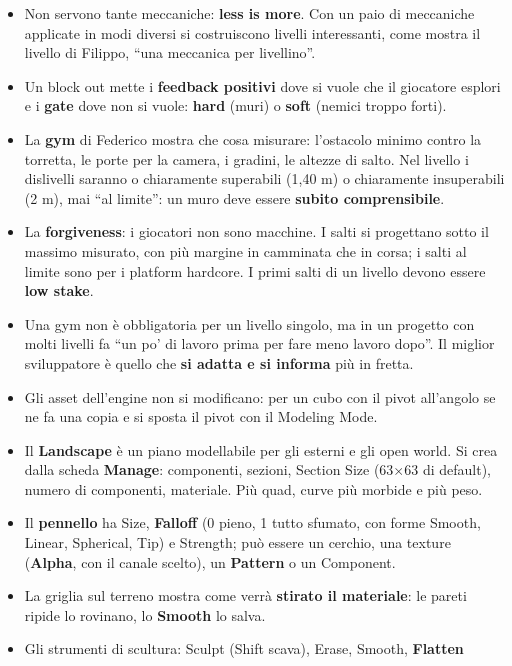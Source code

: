 \begin{itemize}
  \item Non servono tante meccaniche: \textbf{less is more}. Con un paio di meccaniche
        applicate in modi diversi si costruiscono livelli interessanti, come mostra il
        livello di Filippo, ``una meccanica per livellino''.
  \item Un block out mette i \textbf{feedback positivi} dove si vuole che il giocatore
        esplori e i \textbf{gate} dove non si vuole: \textbf{hard} (muri) o \textbf{soft}
        (nemici troppo forti).
  \item La \textbf{gym} di Federico mostra che cosa misurare: l'ostacolo minimo contro la
        torretta, le porte per la camera, i gradini, le altezze di salto. Nel livello i
        dislivelli saranno o chiaramente superabili (1,40 m) o chiaramente insuperabili
        (2 m), mai ``al limite'': un muro deve essere \textbf{subito comprensibile}.
  \item La \textbf{forgiveness}: i giocatori non sono macchine. I salti si progettano sotto il
        massimo misurato, con più margine in camminata che in corsa; i salti al limite sono
        per i platform hardcore. I primi salti di un livello devono essere \textbf{low
        stake}.
  \item Una gym non è obbligatoria per un livello singolo, ma in un progetto con molti
        livelli fa ``un po' di lavoro prima per fare meno lavoro dopo''. Il miglior
        sviluppatore è quello che \textbf{si adatta e si informa} più in fretta.
  \item Gli asset dell'engine non si modificano: per un cubo con il pivot all'angolo se ne fa
        una copia e si sposta il pivot con il Modeling Mode.
  \item Il \textbf{Landscape} è un piano modellabile per gli esterni e gli open world. Si crea
        dalla scheda \textbf{Manage}: componenti, sezioni, Section Size (63$\times$63 di
        default), numero di componenti, materiale. Più quad, curve più morbide e più peso.
  \item Il \textbf{pennello} ha Size, \textbf{Falloff} (0 pieno, 1 tutto sfumato, con forme
        Smooth, Linear, Spherical, Tip) e Strength; può essere un cerchio, una texture
        (\textbf{Alpha}, con il canale scelto), un \textbf{Pattern} o un Component.
  \item La griglia sul terreno mostra come verrà \textbf{stirato il materiale}: le pareti
        ripide lo rovinano, lo \textbf{Smooth} lo salva.
  \item Gli strumenti di scultura: Sculpt (Shift scava), Erase, Smooth, \textbf{Flatten}

\end{itemize}
